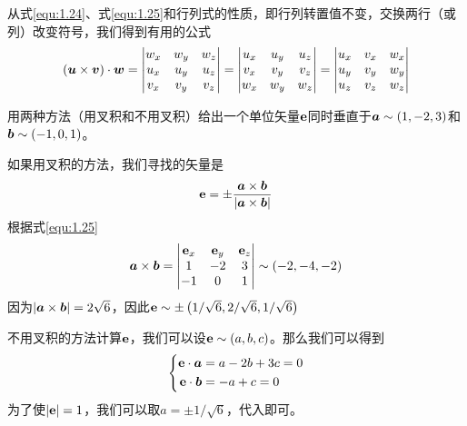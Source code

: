 从式\eqref{equ:1.24}、式\eqref{equ:1.25}和行列式的性质，即行列转置值不变，交换两行（或列）改变符号，我们得到有用的公式
\begin{equation}\label{equ:1.26}
    (\bb{u}\times \bb{v})\cdot \bb{w}=\left| \begin{matrix}
        w_x&		w_y&		w_z\\
        u_x&		u_y&		u_z\\
        v_x&		v_y&		v_z\\
    \end{matrix} \right|=\left| \begin{matrix}
        u_x&		u_y&		u_z\\
        v_x&		v_y&		v_z\\
        w_x&		w_y&		w_z\\
    \end{matrix} \right|=\left| \begin{matrix}
        u_x&		v_x&		w_x\\
        u_y&		v_y&		w_y\\
        u_z&		v_z&		w_z\\
    \end{matrix} \right|
\end{equation}

\begin{example}
    用两种方法（用叉积和不用叉积）给出一个单位矢量$\bf{e}$同时垂直于$\bb{a}\sim \left( 1,-2,3 \right) $和$\bb{b}\sim \left( -1,0,1 \right) $。
\end{example}
\begin{solution}
    如果用叉积的方法，我们寻找的矢量是
    \begin{equation*}
        \bf{e}=\pm \frac{\bb{a}\times \bb{b}}{\left| \bb{a}\times \bb{b} \right|}
    \end{equation*}
    根据式\eqref{equ:1.25}
    \begin{equation*}
        \bb{a}\times \bb{b}=\left| \begin{matrix}
            \bf{e}_x&		\bf{e}_y&		\bf{e}_z\\
            1&		-2&		3\\
            -1&		0&		1\\
        \end{matrix} \right|\sim \left( -2,-4,-2 \right) 
    \end{equation*}
    因为$\left| \bb{a}\times \bb{b} \right|=2\sqrt{6}$，因此$\bf{e}\sim \pm \left( 1/\sqrt{6},2/\sqrt{6},1/\sqrt{6} \right) $

    不用叉积的方法计算$\bf{e}$，我们可以设$\bf{e}\sim \left( a,b,c \right) $。那么我们可以得到
    \begin{equation*}
        \left\{ \begin{aligned}
            \bf{e}\cdot \bb{a}&=a-2b+3c=0\\
            \bf{e}\cdot \bb{b}&=-a+c=0\\
        \end{aligned} \right. 
    \end{equation*}
    为了使$\left| \bf{e} \right|=1$，我们可以取$a=\pm 1/\sqrt{6}$，代入即可。
\end{solution}

